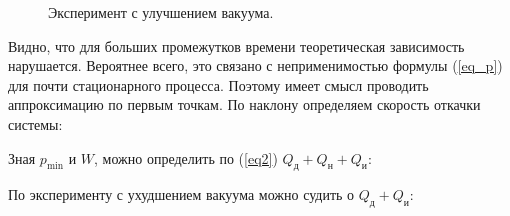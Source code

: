 \documentclass[a4paper,12pt]{article}
\begin{document}
\begin{figure}[h]
	\caption{
		Эксперимент с улучшением вакуума.
	}
	\label{g1}
\end{figure}
\newpage
Видно, что для больших промежутков времени теоретическая зависимость нарушается. Вероятнее всего, это связано с неприменимостью формулы (\ref{eq_p}) для почти стационарного процесса. Поэтому имеет смысл проводить аппроксимацию по первым точкам. По наклону определяем скорость откачки системы: \vspace{0cm}
\begin{center}
\end{center} \vspace{0.2cm}
\par Зная $p_\text{min}$ и $W$, можно определить по (\ref{eq2}) $Q_\text{д} + Q_\text{н} + Q_\text{и}$:
\begin{center}
\end{center}
\par По эксперименту с ухудшением вакуума можно судить о $Q_\text{д} + Q_\text{и}$:
\end{document}
